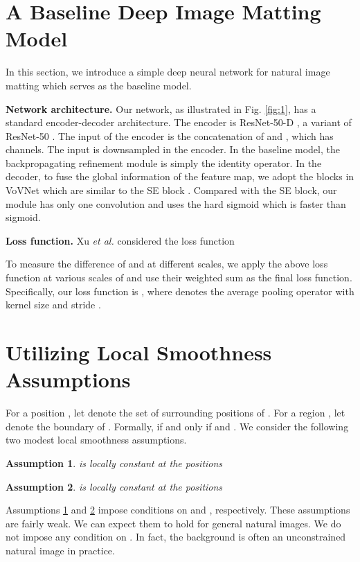 \documentclass{article}
\theoremstyle{plain}
\newtheorem{assumption}{Assumption}
\begin{document}
\section{A Baseline Deep Image Matting Model}
In this section, we introduce a simple deep neural network for natural image matting which serves as the baseline model.




\textbf{Network architecture.}
Our network, as illustrated in Fig. \ref{fig:1},
has a standard encoder-decoder architecture.
The encoder is ResNet-50-D \cite{He2019BagOfTricks}, a variant of ResNet-50 \cite{He2016DeepResidual}.
The input of the encoder is the concatenation of  and , which has  channels.
The input is  downsampled in the encoder.
In the baseline model, the backpropagating refinement module is simply the identity operator.
In the decoder,
to fuse the global information of the feature map,
we adopt the blocks in VoVNet \cite{Lee2019AnEnergy} which are similar to the SE block \cite{Hu2020SqueezeAndExcitation}.
Compared with the SE block, 
our module has only one convolution and uses the hard sigmoid which is faster than sigmoid.




\textbf{Loss function.}
Xu \emph{et al.} \cite{Xu2017DeepImageMatting} considered the loss function
{\small

}To measure the difference of  and  at different scales, we apply the above loss function at various scales of  and use their weighted sum as the final loss function.
Specifically, our loss function is
        ,
where  denotes the average pooling operator with kernel size  and stride .






\section{Utilizing Local Smoothness Assumptions}











For a position , let  denote the set of  surrounding positions of .
For a region , let  denote the boundary of .
Formally,  if and only if  and .
We consider the following two modest local smoothness assumptions.
\begin{assumption}\label{assumption1}
         is locally constant at the positions
        {\small
            
        }\end{assumption}
\begin{assumption}\label{assumption2}
         is locally constant at the positions
        {\small
            
        }\end{assumption}
Assumptions \ref{assumption1} and \ref{assumption2} impose conditions on  and , respectively.
These assumptions are fairly weak.
We can expect them to hold for general natural images.
We do not impose any condition on .
In fact,
the background  is often an unconstrained natural image in practice.
\end{document}
